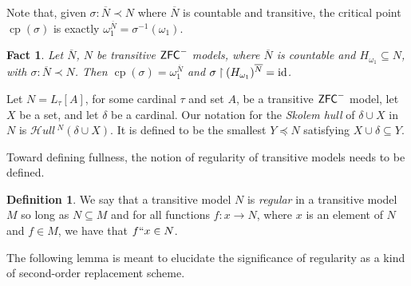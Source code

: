 \documentclass{amsart}
\newtheorem{fact}[theorem]{Fact}
\theoremstyle{definition}
\newtheorem{definition}[theorem]{Definition}
\theoremstyle{remark}
\newtheorem{remark}[theorem]{Remark}
\newcommand{\N}{{\overline{N}}}
\newcommand{\ZFC}{\textup{\ensuremath{\textsf{ZFC}}}}
\newcommand{\id}{\textup{\ensuremath{\text{id}}}}
\DeclareMathOperator{\cp}{cp}
\newcommand{\To}{\longrightarrow}
\newcommand{\rest}{\mathbin{\upharpoonright}}
\newcommand{\SH}{\mathcal{H}\textit{ull} \,}
\newcommand{\Sk}[3]{\SH^{#1}( {#2} \cup {#3} ) }
\begin{document}
Note that, given $\sigma: \N \prec N$ where $\N$ is countable and transitive, the critical point $\cp(\sigma)$ is exactly $\omega_1^{\N} = \sigma^{-1}(\omega_1)$.

\begin{fact} \label{fact:CPofourEmbeddings} Let $\N$, $N$ be transitive $\ZFC^-$ models, where $\N$ is countable and $H_{\omega_1} \subseteq N$, with $\sigma: \N \prec N$. Then $\cp(\sigma)=\omega_1^{\N}$ and $\sigma \rest (H_{\omega_1})^{\N} = \id$. \end{fact}

Let $N = L_\tau[A]$, for some cardinal $\tau$ and set $A$, be a transitive $\ZFC^-$ model, let $X$ be a set, and let $\delta$ be a cardinal. Our notation for the \emph{Skolem hull} of $\delta \cup X$ in $N$ is $\Sk{N}{\delta}{X}$. It is defined to be the smallest $Y \preccurlyeq N$ satisfying $X \cup \delta \subseteq Y$.
	
%
%

Toward defining fullness, the notion of regularity of transitive models needs to be defined.

\begin{definition} We say that a transitive model $N$ is \emph{regular} in a transitive model $M$ so long as $N \subseteq M$ and for all functions $f: x \To N$, where $x$ is an element of $N$ and $f \in M$, we have that $f``x \in N$. \end{definition}
The following lemma is meant to elucidate the significance of regularity as a kind of second-order
replacement scheme.
\end{document}

